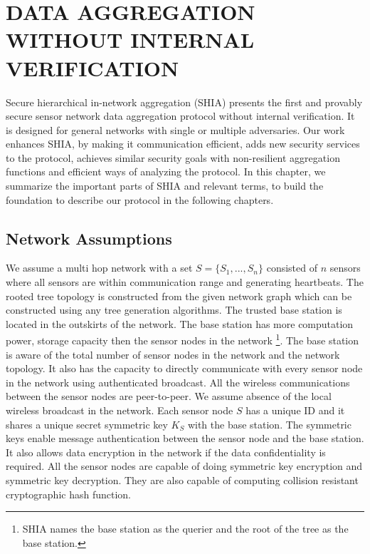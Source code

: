 \chapter{DATA AGGREGATION WITHOUT INTERNAL VERIFICATION} %
	\label{cha:Data Aggregation Without Internal Verification}

	Secure hierarchical in-network aggregation (SHIA) \cite{chan2006secure} presents the first and provably secure sensor network data aggregation protocol without internal verification.
	It is designed for general networks with single or multiple adversaries.
	Our work enhances SHIA, by making it communication efficient, adds new security services to the protocol, achieves similar security goals with non-resilient aggregation functions and efficient ways of analyzing the protocol.
	In this chapter, we summarize the important parts of SHIA and relevant terms, to build the foundation to describe our protocol in the following chapters.

\section{Network Assumptions}
	We assume a multi hop network with a set $ S = \{S_{1},...,S_{n}\} $ consisted of $n$ sensors where all sensors are  within communication range and generating heartbeats. 
	The rooted tree topology is constructed from the given network graph which can be constructed using any tree generation algorithms.
	The trusted base station is located in the outskirts of the network.
	The base station has more computation power, storage capacity then the sensor nodes in the network 
	\footnote{SHIA names the base station as the querier and the root of the tree as the base station.}. 
	The base station is aware of the total number of sensor nodes in the network and the network topology. 
	It also has the capacity to directly communicate with every sensor node in the network using authenticated broadcast.
	All the wireless communications between the sensor nodes are peer-to-peer.
	We assume absence of the local wireless broadcast in the network.
	Each sensor node $S$ has a unique ID and it shares a unique secret symmetric key $K_{S}$ with the base station.
	The symmetric keys enable message authentication between the sensor node and the base station.
	It also allows data encryption in the network if the data confidentiality is required.
	All the sensor nodes are capable of doing symmetric key encryption and symmetric key decryption.
	They are also capable of computing collision resistant cryptographic hash function. 

